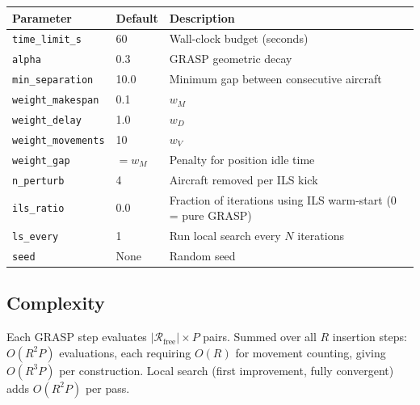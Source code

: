 \begin{center}
\begin{tabular}{lll}
\toprule
Parameter & Default & Description \\
\midrule
\texttt{time\_limit\_s}   & 60   & Wall-clock budget (seconds) \\
\texttt{alpha}            & 0.3  & GRASP geometric decay \\
\texttt{min\_separation}  & 10.0 & Minimum gap between consecutive aircraft \\
\texttt{weight\_makespan} & 0.1  & $w_M$ \\
\texttt{weight\_delay}    & 1.0  & $w_D$ \\
\texttt{weight\_movements}& 10   & $w_V$ \\
\texttt{weight\_gap}      & $=w_M$ & Penalty for position idle time \\
\texttt{n\_perturb}       & 4    & Aircraft removed per ILS kick \\
\texttt{ils\_ratio}       & 0.0  & Fraction of iterations using ILS warm-start (0 = pure GRASP) \\
\texttt{ls\_every}        & 1    & Run local search every $N$ iterations \\
\texttt{seed}             & None & Random seed \\
\bottomrule
\end{tabular}
\end{center}

\subsection{Complexity}

Each GRASP step evaluates $|\mathcal{R}_{\text{free}}| \times P$ pairs.
Summed over all $R$ insertion steps: $O(R^2 P)$ evaluations, each requiring
$O(R)$ for movement counting, giving $O(R^3 P)$ per construction.  Local search
(first improvement, fully convergent) adds $O(R^2 P)$ per pass.
